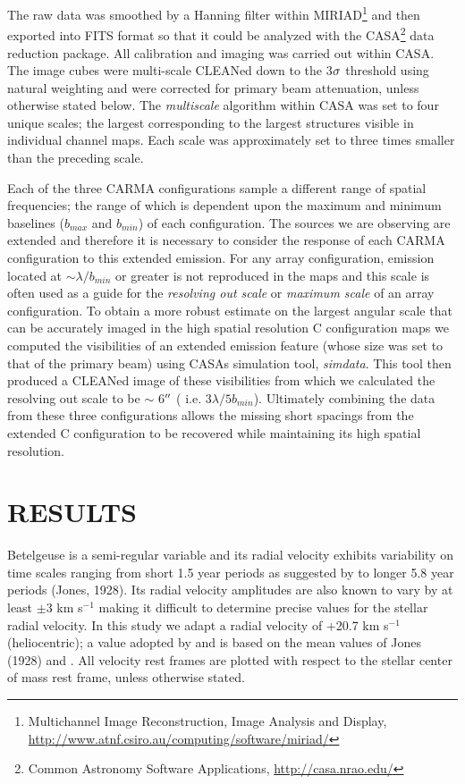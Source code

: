 \documentclass[preprint2]{aastex}
\begin{document}
The raw data was smoothed by a Hanning filter within MIRIAD\footnote{Multichannel Image Reconstruction, Image Analysis and Display, \url{http://www.atnf.csiro.au/computing/software/miriad/}} and then exported into FITS format so that it could be analyzed with the CASA\footnote{Common Astronomy Software Applications, \url{http://casa.nrao.edu/}} data reduction package. All calibration and imaging was carried out within CASA. The image cubes  were multi-scale  CLEANed down to the 3$\rm{\sigma}$ threshold using natural weighting and were corrected for primary beam attenuation, unless otherwise stated below. The \textit{multiscale} algorithm \citep{2008AJ....136.2897R} within CASA was set to four unique scales; the largest corresponding to the largest structures visible in individual channel maps. Each scale was approximately set to three times smaller than the preceding scale. 

Each of the three CARMA configurations sample a different range of spatial frequencies; the range of which is dependent upon the maximum and minimum baselines ($b_{max}$ and $b_{min}$) of each configuration. The sources we are observing are extended and therefore it is necessary to consider the response of each CARMA configuration to this extended emission. For any array configuration, emission located at $\sim \lambda/b_{min}$ or greater is not reproduced in the maps \citep{1999ASPC..180.....T} and this scale is often used as a guide for the \textit{resolving out scale} or \textit{maximum scale} of an array configuration. To obtain a more robust estimate on the largest angular scale that can be accurately imaged in the high spatial resolution C configuration maps we computed the visibilities of an extended emission feature (whose size was set to that of the primary beam) using CASAs simulation tool, \textit{simdata}. This tool then produced a CLEANed image of these visibilities from which we calculated the resolving out scale to be $\sim$ 6$\mbox{$^{\prime\prime}$}$ ( i.e. $3\lambda/5b_{min}$). Ultimately combining the data from these three configurations allows the missing short spacings from the extended C configuration to be recovered while maintaining its high spatial resolution.

\section{RESULTS} 

Betelgeuse is a  semi-regular variable and its radial velocity exhibits variability on time scales ranging from short 1.5 year periods as suggested by \cite{1931PWasO..15..178S} to longer 5.8 year periods (Jones, 1928). Its radial velocity amplitudes are also known to vary by at least $\pm$3 km s${}^{-1}$ \citep{1989AJ.....98.2233S} making it difficult to determine precise values for the stellar radial velocity. In this study we adapt a radial velocity of +20.7 km s${}^{-1}$ (heliocentric); a value adopted by \citet{2008AJ....135.1430H} and is based on the mean values of Jones (1928) and \cite{1933CMWCI.464....1S}. All velocity rest frames are plotted with respect to the stellar center of mass rest frame, unless otherwise stated.
\end{document}
